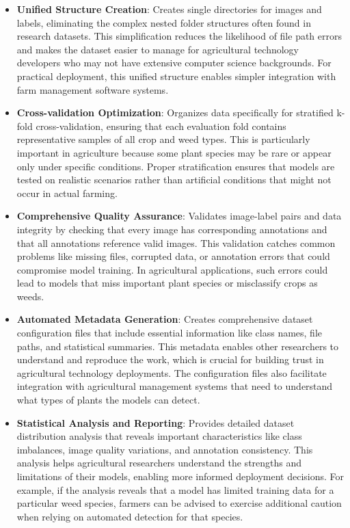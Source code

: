 \begin{itemize}
    \item \textbf{Unified Structure Creation}: Creates single directories for images and labels, eliminating the complex nested folder structures often found in research datasets. This simplification reduces the likelihood of file path errors and makes the dataset easier to manage for agricultural technology developers who may not have extensive computer science backgrounds. For practical deployment, this unified structure enables simpler integration with farm management software systems.
    
    \item \textbf{Cross-validation Optimization}: Organizes data specifically for stratified k-fold cross-validation, ensuring that each evaluation fold contains representative samples of all crop and weed types. This is particularly important in agriculture because some plant species may be rare or appear only under specific conditions. Proper stratification ensures that models are tested on realistic scenarios rather than artificial conditions that might not occur in actual farming.
    
    \item \textbf{Comprehensive Quality Assurance}: Validates image-label pairs and data integrity by checking that every image has corresponding annotations and that all annotations reference valid images. This validation catches common problems like missing files, corrupted data, or annotation errors that could compromise model training. In agricultural applications, such errors could lead to models that miss important plant species or misclassify crops as weeds.
    
    \item \textbf{Automated Metadata Generation}: Creates comprehensive dataset configuration files that include essential information like class names, file paths, and statistical summaries. This metadata enables other researchers to understand and reproduce the work, which is crucial for building trust in agricultural technology deployments. The configuration files also facilitate integration with agricultural management systems that need to understand what types of plants the models can detect.
    
    \item \textbf{Statistical Analysis and Reporting}: Provides detailed dataset distribution analysis that reveals important characteristics like class imbalances, image quality variations, and annotation consistency. This analysis helps agricultural researchers understand the strengths and limitations of their models, enabling more informed deployment decisions. For example, if the analysis reveals that a model has limited training data for a particular weed species, farmers can be advised to exercise additional caution when relying on automated detection for that species.
\end{itemize}

